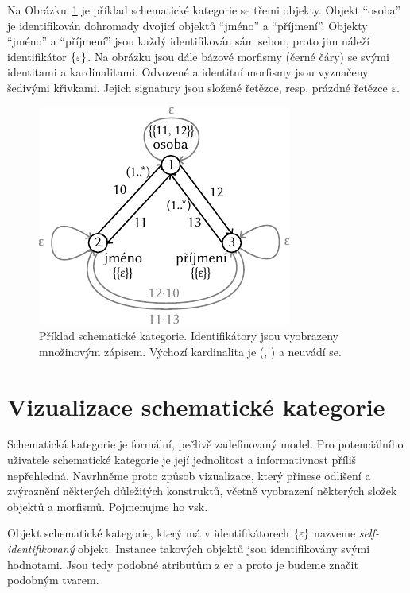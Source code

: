 Na Obrázku~\ref{fig:raw-schemcat} je příklad schematické kategorie se třemi objekty.
Objekt \enquote{osoba} je identifikován dohromady dvojicí objektů \enquote{jméno} a \enquote{příjmení}.
Objekty \enquote{jméno} a \enquote{příjmení} jsou každý identifikován sám sebou, proto jim náleží identifikátor $\left\{\varepsilon\right\}$.
Na obrázku jsou dále bázové morfismy (černé čáry) se svými identitami a kardinalitami.
Odvozené a identitní morfismy jsou vyznačeny šedivými křivkami.
Jejich signatury jsou složené řetězce, resp. prázdné řetězce $\varepsilon$.

\begin{figure}[!htb]
  \centering
  \includegraphics[width=\maxwidth{\textwidth}]{../img/schemcat-diagrams/raw-schemcat-example.pdf}
  \caption[Příklad schematické kategorie]{Příklad schematické kategorie. Identifikátory jsou vyobrazeny množinovým zápisem. Výchozí kardinalita je (\one, \one) a neuvádí se.}
  \label{fig:raw-schemcat}
\end{figure}

\section{Vizualizace schematické kategorie}\label{section:vsk}

Schematická kategorie je formální, pečlivě zadefinovaný model.
Pro potenciálního uživatele schematické kategorie je její jednolitost a informativnost příliš nepřehledná.
Navrhněme proto způsob vizualizace, který přinese odlišení a zvýraznění některých důležitých konstruktů, včetně vyobrazení některých složek objektů a morfismů.
Pojmenujme ho \acrfull{vsk}.

Objekt schematické kategorie, který má v identifikátorech $\left\{\varepsilon\right\}$ nazveme \emph{self-identifikovaný} objekt.
Instance takových objektů jsou identifikovány svými hodnotami.
Jsou tedy podobné atributům z \acrshort{er} a proto je budeme značit podobným tvarem.

